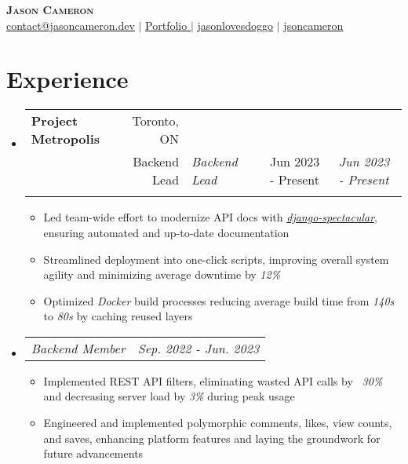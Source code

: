 \documentclass[letterpaper,11pt]{article}
\makeatletter
\newcommand{\resumeItem}[1]{
    \item\small{
            {#1 \vspace{-2pt}}
    }
}
\newcommand{\resumeSubheading}[4]{%
    \vspace{-2pt}\item
    \begin{tabular*}{0.97\textwidth}[t]{@{}l@{\extracolsep{\fill}}r@{}}
        \textbf{#1} & #2 \\
        \ifx & #3 &%
        \else
        \textit{\small#3} &
        \fi
        \ifx & #4 &%
        \else
        \textit{\small #4} \\
        \fi
    \end{tabular*}\vspace{-7pt}%
}
\newcommand{\resumeSubSubheading}[2]{
    \item
    \begin{tabular*}{0.97\textwidth}{l@{\extracolsep{\fill}}r}
        \textit{\small#1} & \textit{\small #2} \\
    \end{tabular*}\vspace{-7pt}
}
\newcommand{\resumeSubHeadingListStart}{\begin{itemize}[leftmargin=0.15in, label={}]}
\newcommand{\resumeSubHeadingListEnd}{\end{itemize}}
\newcommand{\resumeItemListStart}{\begin{itemize}}
\newcommand{\resumeItemListEnd}{\end{itemize}\vspace{-5pt}}
\makeatother
\begin{document}
\begin{center}
\textbf{\Huge \scshape Jason Cameron} \\ \vspace{1pt}
\underline{\href{mailto:contact@jasoncameron.dev}{\raisebox{-0.05\height}{\faEnvelope} contact@jasoncameron.dev}} $|$
\underline{\href{https://jasoncameron.dev}{\raisebox{-0.05\height}{\faDesktop} Portfolio $|$}}
\underline{\href{https://github.com/jasonlovesdoggo}{\raisebox{-0.05\height}{\faGithub} jasonlovesdoggo}} $|$
\underline{\href{https://www.linkedin.com/in/jsoncameron/}{\raisebox{-0.05\height}{\faLinkedin} jsoncameron}}
\end{center}

\section{Experience}
\resumeSubHeadingListStart
\resumeSubheading
{Project Metropolis}{Toronto, ON}
{Backend Lead}{Jun 2023 - Present}

\resumeItemListStart
\resumeItem{
Led team-wide effort to modernize API docs with \emph{\href{https://github.com/tfranzel/drf-spectacular}{django-spectacular}}, ensuring automated and up-to-date documentation}
\resumeItem{
Streamlined deployment into one-click scripts, improving overall system agility and minimizing average downtime by \emph{12\%}}
\resumeItem{Optimized \emph{Docker} build processes reducing average build time from \emph{140s} to \emph{80s} by caching reused layers}

\resumeSubHeadingListEnd
\resumeSubSubheading
{Backend Member}{Sep. 2022 - Jun. 2023}
\resumeItemListStart
\resumeItem{
Implemented REST API filters, eliminating wasted API calls by \emph{~30\%} and decreasing server load by \emph{3\%} during peak usage}  %
\resumeItem{Engineered and implemented polymorphic comments, likes, view counts, and saves, enhancing platform features and laying the groundwork for future advancements}
\resumeItemListEnd
\resumeSubHeadingListEnd
\end{document}
